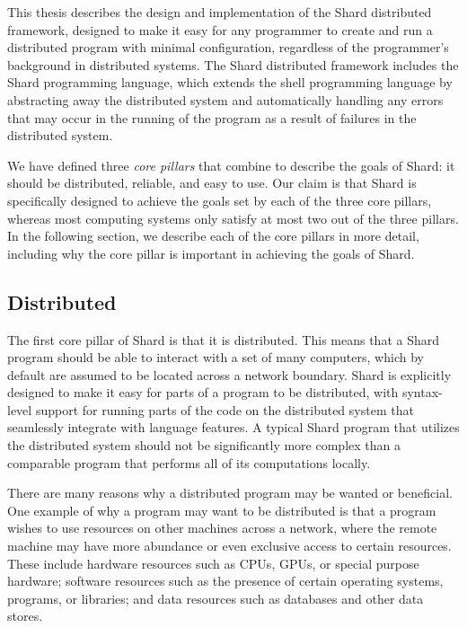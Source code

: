 \documentclass[oneside]{report}
\begin{document}
This thesis describes the design and implementation of the Shard distributed framework, designed to make it easy for any programmer to create and run a distributed program with minimal configuration, regardless of the programmer's background in distributed systems. The Shard distributed framework includes the Shard programming language, which extends the shell programming language by abstracting away the distributed system and automatically handling any errors that may occur in the running of the program as a result of failures in the distributed system.

We have defined three \textit{core pillars} that combine to describe the goals of Shard: it should be distributed, reliable, and easy to use. Our claim is that Shard is specifically designed to achieve the goals set by each of the three core pillars, whereas most computing systems only satisfy at most two out of the three pillars.
In the following section, we describe each of the core pillars in more detail, including why the core pillar is important in achieving the goals of Shard.

\subsection{Distributed}

The first core pillar of Shard is that it is distributed.
This means that a Shard program should be able to interact with a set of many computers, which by default are assumed to be located across a network boundary.
Shard is explicitly designed to make it easy for parts of a program to be distributed, with syntax-level support for running parts of the code on the distributed system that seamlessly integrate with language features.
A typical Shard program that utilizes the distributed system should not be significantly more complex than a comparable program that performs all of its computations locally.

There are many reasons why a distributed program may be wanted or beneficial.
One example of why a program may want to be distributed is that a program wishes to use resources on other machines across a network, where the remote machine may have more abundance or even exclusive access to certain resources.
These include hardware resources such as CPUs, GPUs, or special purpose hardware; software resources such as the presence of certain operating systems, programs, or libraries; and data resources such as databases and other data stores.
\end{document}
